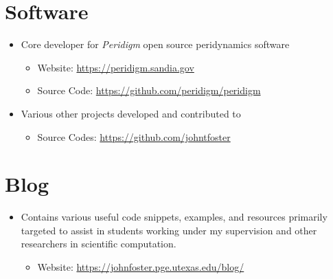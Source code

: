 \section*{Software}

\begin{itemize}
    \item Core developer for \emph{Peridigm} open source peridynamics software
        \begin{itemize}
            \item Website: \href{https://peridigm.sandia.gov}{https://peridigm.sandia.gov}
            \item Source Code: \href{https://github.com/peridigm/peridigm}{https://github.com/peridigm/peridigm}
        \end{itemize}
    \item Various other projects developed and contributed to
        \begin{itemize}
            \item Source Codes: \href{https://github.com/johntfoster}{https://github.com/johntfoster}
        \end{itemize}
\end{itemize}

\section*{Blog}

\begin{itemize}
    \item Contains various useful code snippets, examples, and resources primarily targeted to assist in students working under my supervision and other researchers in scientific computation.
        \begin{itemize}
            \item Website: \href{https://johnfoster.pge.utexas.edu/blog/}{https://johnfoster.pge.utexas.edu/blog/}
        \end{itemize}
\end{itemize}

